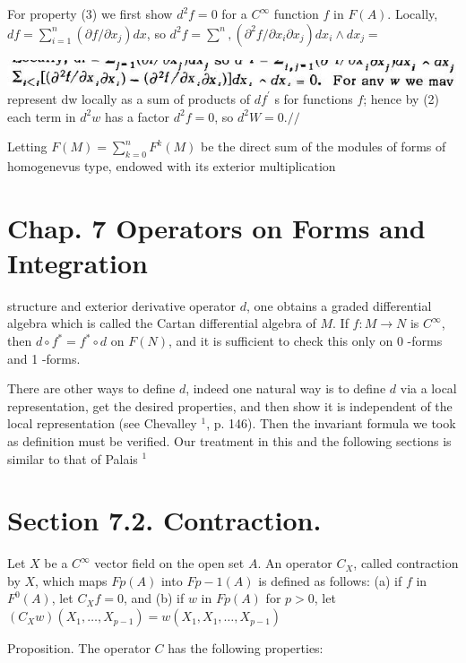\documentclass[10pt]{article}
\begin{document}
For property (3) we first show $d^{2} f=0$ for a $C^{\infty}$ function $f$ in $F(A)$. Locally, $d f=\sum_{i=1}^{n}\left(\partial f / \partial x_{j}\right) d x$, so $d^{2} f=\sum^{n},\left(\partial^{2} f / \partial x_{i} \partial x_{j}\right) d x_{i} \wedge d x_{j}=$

\includegraphics[max width=\textwidth]{2022_07_16_f4e476ee2159dc67e746g-49}\\
represent dw locally as a sum of products of $d f^{\prime}$ s for functions $f$; hence by (2) each term in $d^{2} w$ has a factor $d^{2} f=0$, so $d^{2} W=0 . / /$

Letting $F(M)=\sum_{k=0}^{n} F^{k}(M)$ be the direct sum of the modules of forms of homogenevus type, endowed with its exterior multiplication

\section{Chap. 7 Operators on Forms and Integration}
structure and exterior derivative operator $d$, one obtains a graded differential algebra which is called the Cartan differential algebra of $M$. If $f: M \rightarrow N$ is $C^{\infty}$, then $d \circ f^{*}=f^{*} \circ d$ on $F(N)$, and it is sufficient to check this only on 0 -forms and 1 -forms.

There are other ways to define $d$, indeed one natural way is to define $d$ via a local representation, get the desired properties, and then show it is independent of the local representation (see Chevalley ${ }^{1}$, p. 146). Then the invariant formula we took as definition must be verified. Our treatment in this and the following sections is similar to that of Palais ${ }^{1}$

\section{Section 7.2. Contraction.}
Let $X$ be a $C^{\infty}$ vector field on the open set $A .$ An operator $C_{X}$, called contraction by $X$, which maps $F p(A)$ into $F p-1(A)$ is defined as follows: (a) if $f$ in $F^{0}(A)$, let $C_{X} f=0$, and (b) if $w$ in $F p(A)$ for $p>0$, let $\left(C_{X} w\right)\left(X_{1}, \ldots, X_{p-1}\right)=w\left(X_{1}, X_{1}, \ldots, X_{p-1}\right)$

Proposition. The operator $C$ has the following properties:
\end{document}

